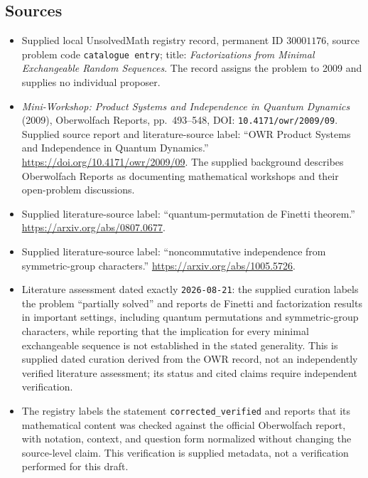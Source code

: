\documentclass[11pt]{article}
\begin{document}
\subsection{Sources}
\begin{itemize}
\item Supplied local UnsolvedMath registry record, permanent ID \(30001176\), source problem code \texttt{catalogue entry}; title: \emph{Factorizations from Minimal Exchangeable Random Sequences}. The record assigns the problem to 2009 and supplies no individual proposer.
\item \emph{Mini-Workshop: Product Systems and Independence in Quantum Dynamics} (2009), Oberwolfach Reports, pp.\ 493--548, DOI: \texttt{10.4171/owr/2009/09}. Supplied source report and literature-source label: ``OWR Product Systems and Independence in Quantum Dynamics.'' \url{https://doi.org/10.4171/owr/2009/09}. The supplied background describes Oberwolfach Reports as documenting mathematical workshops and their open-problem discussions.
\item Supplied literature-source label: ``quantum-permutation de Finetti theorem.'' \url{https://arxiv.org/abs/0807.0677}.
\item Supplied literature-source label: ``noncommutative independence from symmetric-group characters.'' \url{https://arxiv.org/abs/1005.5726}.
\item Literature assessment dated exactly \texttt{2026-08-21}: the supplied curation labels the problem ``partially solved'' and reports de Finetti and factorization results in important settings, including quantum permutations and symmetric-group characters, while reporting that the implication for every minimal exchangeable sequence is not established in the stated generality. This is supplied dated curation derived from the OWR record, not an independently verified literature assessment; its status and cited claims require independent verification.
\item The registry labels the statement \texttt{corrected\_verified} and reports that its mathematical content was checked against the official Oberwolfach report, with notation, context, and question form normalized without changing the source-level claim. This verification is supplied metadata, not a verification performed for this draft.
\end{itemize}
\end{document}
